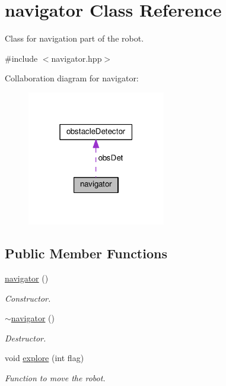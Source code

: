 \hypertarget{classnavigator}{}\section{navigator Class Reference}
\label{classnavigator}


Class for navigation part of the robot.  




{\ttfamily \#include $<$navigator.\+hpp$>$}



Collaboration diagram for navigator\+:
\nopagebreak
\begin{figure}[H]
\begin{center}
\leavevmode
\includegraphics[width=171pt]{classnavigator__coll__graph}
\end{center}
\end{figure}
\subsection*{Public Member Functions}
\begin{DoxyCompactItemize}
\item 
\hyperlink{classnavigator_a56f8f7c47b89e2496a6c95155f163f4a}{navigator} ()\hypertarget{classnavigator_a56f8f7c47b89e2496a6c95155f163f4a}{}\label{classnavigator_a56f8f7c47b89e2496a6c95155f163f4a}

\begin{DoxyCompactList}\small\item\em Constructor. \end{DoxyCompactList}\item 
\hyperlink{classnavigator_a3f3e027d3b440b100426abb9aba16b5e}{$\sim$navigator} ()\hypertarget{classnavigator_a3f3e027d3b440b100426abb9aba16b5e}{}\label{classnavigator_a3f3e027d3b440b100426abb9aba16b5e}

\begin{DoxyCompactList}\small\item\em Destructor. \end{DoxyCompactList}\item 
void \hyperlink{classnavigator_abe0798d499bb9cbd606fa5a398c863cb}{explore} (int flag)
\begin{DoxyCompactList}\small\item\em Function to move the robot. \end{DoxyCompactList}\end{DoxyCompactItemize}

